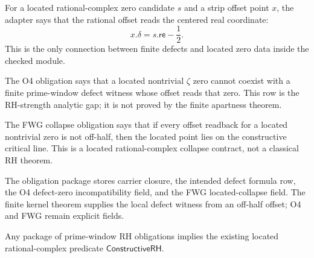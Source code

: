 \begin{definition}
\label{def:rh-prime-window-zero-readback-adapter}
For a located rational-complex zero candidate $s$ and a strip offset point
$x$, the adapter says that the rational offset reads the centered real
coordinate:
$$
x.\delta = s.\mathsf{re}-\frac12.
$$
This is the only connection between finite defects and located zero data
inside the checked module.
\end{definition}

\begin{definition}
\label{def:rh-prime-window-defect-zero-incompatibility}
The O4 obligation says that a located nontrivial $\zeta$ zero cannot
coexist with a finite prime-window defect witness whose offset reads that
zero. This row is the RH-strength analytic gap; it is not proved by the
finite apartness theorem.
\end{definition}

\begin{definition}
\label{def:rh-prime-window-finite-window-global-collapse}
The FWG collapse obligation says that if every offset readback for a
located nontrivial zero is not off-half, then the located point lies on
the constructive critical line. This is a located rational-complex
collapse contract, not a classical RH theorem.
\end{definition}

\begin{definition}
\label{def:rh-prime-window-rh-obligations}
The obligation package stores carrier closure, the intended defect
formula row, the O4 defect-zero incompatibility field, and the FWG
located-collapse field. The finite kernel theorem supplies the local
defect witness from an off-half offset; O4 and FWG remain explicit
fields.
\end{definition}

\begin{theorem}
\label{thm:rh-prime-window-obligations-imply-constructive-rh}
Any package of prime-window RH obligations implies the existing located
rational-complex predicate $\mathsf{ConstructiveRH}$.
\end{theorem}

